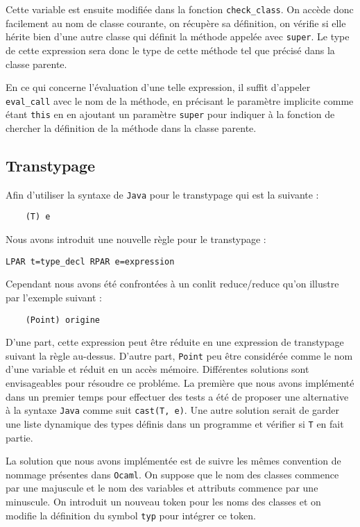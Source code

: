 \documentclass{article}
\begin{document}
Cette variable est ensuite modifiée dans la fonction \texttt{check\_class}.
On accède donc facilement au nom de classe courante, on récupère sa définition, on vérifie si elle hérite bien d'une 
autre classe qui définit la méthode appelée avec \texttt{super}. Le type de cette expression sera donc 
le type de cette méthode tel que précisé dans la classe parente.

En ce qui concerne l'évaluation d'une telle expression, il suffit 
d'appeler \texttt{eval\_call} avec le nom de la méthode, en précisant le 
paramètre implicite comme étant \texttt{this} en en ajoutant un paramètre \texttt{super}
pour indiquer à la fonction de chercher la définition de la méthode 
dans la classe parente.



\subsection{Transtypage}
Afin d'utiliser la syntaxe de \texttt{Java} pour le transtypage qui est la suivante : 
\begin{verbatim}
    (T) e
\end{verbatim}
Nous avons introduit une nouvelle règle pour le transtypage : 
\begin{lstlisting}[style=mystyle]
    LPAR t=type_decl RPAR e=expression
\end{lstlisting}
Cependant nous avons été confrontées à un conlit reduce/reduce qu'on illustre par l'exemple suivant : 
\begin{verbatim}
    (Point) origine
\end{verbatim}
D'une part, cette expression peut être réduite en une expression de transtypage 
suivant la règle au-dessus. D'autre part, \texttt{Point} peu être considérée comme le nom d'une variable et réduit 
en un accès mémoire. Différentes solutions sont envisageables pour résoudre ce probléme. 
La première que nous avons implémenté dans un premier temps pour effectuer des tests a été de 
proposer une alternative à la syntaxe \texttt{Java} comme suit \texttt{cast(T, e)}.
Une autre solution serait de garder une liste dynamique des types définis dans un programme et vérifier si \texttt{T}
en fait partie.

La solution que nous avons implémentée est de suivre les mêmes convention de nommage présentes dans \texttt{Ocaml}.
On suppose que le nom des classes commence par une majuscule et le nom des variables et attributs commence par une minuscule.
On introduit un nouveau token pour les noms des classes et on modifie la définition du symbol \texttt{typ} pour intégrer ce token.
\end{document}
